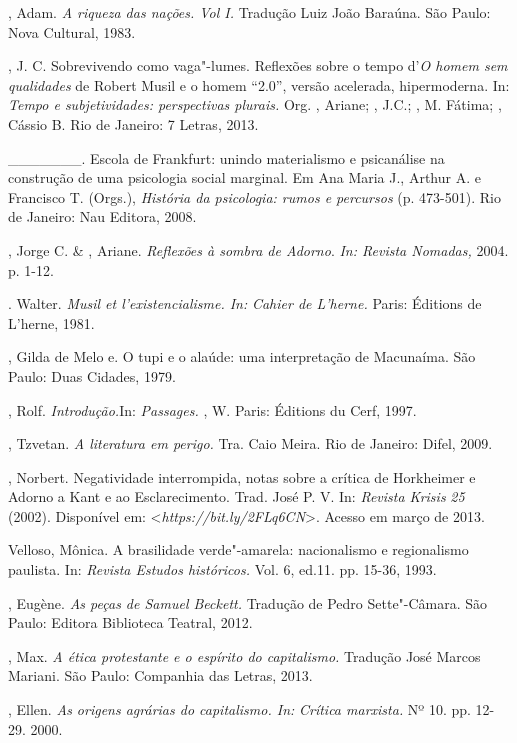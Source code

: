 \begin{Parskip}
, Adam. \emph{A riqueza das nações. Vol I.} Tradução Luiz João
Baraúna. São Paulo: Nova Cultural, 1983.

, J. C. Sobrevivendo como vaga"-lumes. Reflexões sobre o tempo
d'\emph{O homem sem qualidades} de Robert Musil e o homem ``2.0'',
versão acelerada, hipermoderna. In: \emph{Tempo e subjetividades:
perspectivas plurais.} Org. , Ariane; , J.C.; , M.
Fátima; , Cássio B. Rio de Janeiro: 7 Letras, 2013.

\_\_\_\_\_\_\_. Escola de Frankfurt: unindo materialismo e psicanálise
na construção de uma psicologia social marginal. Em Ana Maria J., Arthur
A. e Francisco T. (Orgs.), \emph{História da psicologia: rumos e
percursos} (p. 473-501). Rio de Janeiro: Nau Editora, 2008.

, Jorge C. \& , Ariane. \emph{Reflexões à sombra de
Adorno}. \emph{In: Revista Nomadas,} 2004. p. 1-12.

. Walter. \emph{Musil et l'existencialisme. In:} \emph{Cahier de
L'herne.} Paris: Éditions de L'herne, 1981.

, Gilda de Melo e. O tupi e o alaúde: uma interpretação de
Macunaíma. São Paulo: Duas Cidades, 1979.

, Rolf. \emph{Introdução.}In: \emph{Passages.} , W.
Paris: Éditions du Cerf, 1997.

, Tzvetan. \emph{A literatura em perigo.} Tra. Caio Meira. Rio
de Janeiro: Difel, 2009.

, Norbert. Negatividade interrompida, notas sobre a crítica de
Horkheimer e Adorno a Kant e ao Esclarecimento. Trad. José P. V. In:
\emph{Revista Krisis} \emph{25} (2002). Disponível em:
\textless{}\emph{https://bit.ly/2FLq6CN}\textgreater{}. Acesso em março de 2013.

Velloso, Mônica. A brasilidade verde"-amarela: nacionalismo e
regionalismo paulista. In: \emph{Revista Estudos históricos.} Vol. 6,
ed.11. pp. 15-36, 1993.

, Eugène. \emph{As peças de Samuel Beckett.} Tradução de Pedro
Sette"-Câmara. São Paulo: Editora Biblioteca Teatral, 2012.

, Max. \emph{A ética protestante e o espírito do capitalismo.}
Tradução José Marcos Mariani. São Paulo: Companhia das Letras, 2013.

, Ellen. \emph{As origens agrárias do capitalismo. In:}
\emph{Crítica marxista\emph{. }}Nº 10. pp. 12-29. 2000.
\end{Parskip}